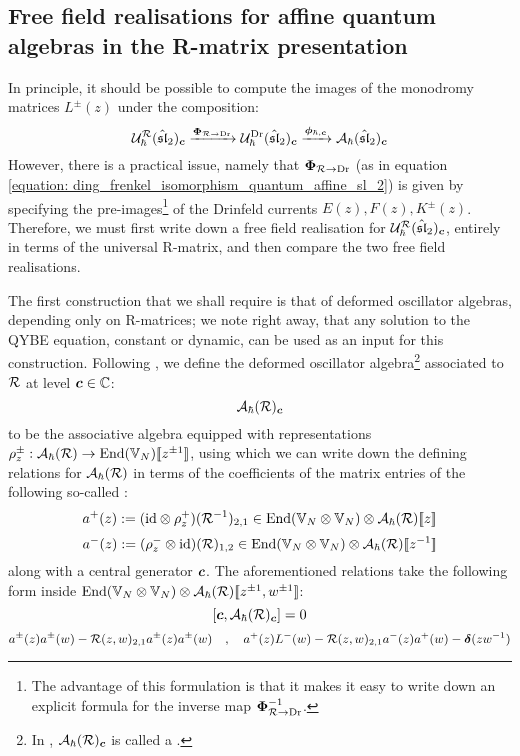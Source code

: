         \subsection{Free field realisations for affine quantum algebras in the R-matrix presentation} \label{subsection: free_field_realisations_for_R_matrix_affine_QUEs}
            In principle, it should be possible to compute the images of the monodromy matrices $L^{\pm}(z)$ under the composition:
                $$\mathcal{U}_{\hbar}^{\mathcal{R}}(\hat{\mathfrak{sl}}_2)_{\boldsymbol{c}} \xrightarrow[]{\boldsymbol{\Phi}_{\mathcal{R} \to \mathrm{Dr}}} \mathcal{U}_{\hbar}^{\mathrm{Dr}}(\hat{\mathfrak{sl}}_2)_{\boldsymbol{c}} \xrightarrow[]{\boldsymbol{\phi}_{\hbar, \boldsymbol{c}}} \mathcal{A}_{\hbar}(\hat{\mathfrak{sl}}_2)_{\boldsymbol{c}}$$
            However, there is a practical issue, namely that $\boldsymbol{\Phi}_{\mathcal{R} \to \mathrm{Dr}}$ (as in equation \eqref{equation: ding_frenkel_isomorphism_quantum_affine_sl_2}) is given by specifying the pre-images\footnote{The advantage of this formulation is that it makes it easy to write down an explicit formula for the inverse map $\boldsymbol{\Phi}_{\mathcal{R} \to \mathrm{Dr}}^{-1}$.} of the Drinfeld currents $E(z), F(z), K^{\pm}(z)$. Therefore, we must first write down a free field realisation for $\mathcal{U}_{\hbar}^{\mathcal{R}}(\hat{\mathfrak{sl}}_2)_{\boldsymbol{c}}$, entirely in terms of the universal R-matrix, and then compare the two free field realisations.

            The first construction that we shall require is that of deformed oscillator algebras, depending only on R-matrices; we note right away, that any solution to the QYBE equation, constant or dynamic, can be used as an input for this construction. Following \cite{ragoucy_vertex_representations_of_R_matrix_quantum_groups}, we define the deformed oscillator algebra\footnote{In \cite{ragoucy_vertex_representations_of_R_matrix_quantum_groups}, $\mathcal{A}_{\hbar}(\mathcal{R})_{\boldsymbol{c}}$ is called a .} associated to $\mathcal{R}$ at level $\boldsymbol{c} \in \mathbb{C}$:
                $$\mathcal{A}_{\hbar}(\mathcal{R})_{\boldsymbol{c}}$$
            to be the associative algebra equipped with representations $\rho_z^{\pm}: \mathcal{A}_{\hbar}(\mathcal{R}) \to \operatorname{End}(\mathbb{V}_N)[\![z^{\pm 1}]\!]$, using which we can write down the defining relations for $\mathcal{A}_{\hbar}(\mathcal{R})$ in terms of the coefficients of the matrix entries of the following so-called :
                $$a^+(z) := (\id \tensor \rho_z^+)( \calR^{-1} )_{2, 1} \in \End(\bbV_N \tensor \bbV_N) \tensor \calA_{\hbar}(\calR)[\![z]\!]$$
                $$a^-(z) := (\rho_z^- \tensor \id)( \calR )_{1, 2} \in \End(\bbV_N \tensor \bbV_N) \tensor \calA_{\hbar}(\calR)[\![z^{-1}]\!]$$
            along with a central generator $\boldsymbol{c}$. The aforementioned relations take the following form inside $\End(\bbV_N \tensor \bbV_N) \tensor \calA_{\hbar}(\calR)[\![z^{\pm 1}, w^{\pm 1}]\!]$:
                $$[\boldsymbol{c}, \mathcal{A}_{\hbar}(\mathcal{R})_{\boldsymbol{c}}] = 0$$
                \begin{equation} \label{equation: deformed_oscillator_algebra_RLL_relations}
                    a^{\pm}(z) a^{\pm}(w) - \mathcal{R}(z, w)_{2, 1} a^{\pm}(z) a^{\pm}(w) \quad, \quad a^+(z) L^-(w) - \mathcal{R}(z, w)_{2, 1} a^-(z) a^+(w) - \boldsymbol{\delta}(zw^{-1})
                \end{equation}
    
